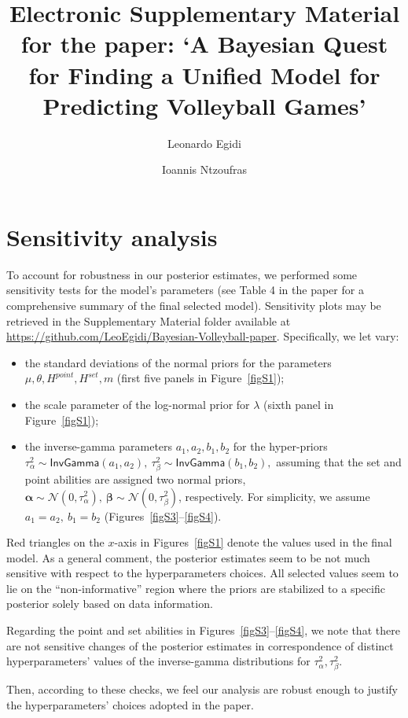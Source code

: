 \documentclass{statsoc}
\title[]{Electronic Supplementary Material for the paper: `A Bayesian Quest for Finding a Unified Model for Predicting Volleyball Games'}
\author[Egidi and Ntzoufras]{Leonardo Egidi}
\author[Egidi and Ntzoufras]{Ioannis Ntzoufras}
\begin{document}
\maketitle



\section*{Sensitivity analysis}

To account for robustness in our posterior estimates, we performed some sensitivity tests for the model's parameters (see Table 4 in the paper for a comprehensive summary of the final selected model). Sensitivity plots may be retrieved in the Supplementary Material folder available at \url{https://github.com/LeoEgidi/Bayesian-Volleyball-paper}. Specifically, we let vary: 


\begin{itemize}
\item the standard deviations of the normal priors for the parameters $\mu, \theta, H^{point}, H^{set}, m$
(first five panels in Figure~\ref{figS1});
\item  the scale parameter of the log-normal prior for $\lambda$ (sixth panel in Figure~\ref{figS1});
\item the inverse-gamma parameters $a_1, a_2, b_1, b_2$ for the hyper-priors $\tau^2_{\alpha} \sim \mathsf{InvGamma}(a_1,a_2), \ \tau^2_{\beta} \sim \mathsf{InvGamma}(b_1,b_2),$ assuming that the set and point abilities are assigned two normal priors, $\bm{\alpha} \sim \mathcal{N}(0, \tau^2_{\alpha}),\ \bm{\beta} \sim \mathcal{N}(0, \tau^2_{\beta}) $, respectively. For simplicity, we assume $a_1=a_2,\ b_1=b_2$ (Figures~\ref{figS3}--\ref{figS4}).
\end{itemize}
%
Red triangles on the $x$-axis in Figures~\ref{figS1} denote the values used in the final model. As a general comment, the posterior estimates seem to be not much sensitive with respect to the hyperparameters choices. All selected values seem to lie on the ``non-informative'' region where the priors are stabilized to a specific posterior solely based on data information. 

Regarding the point and set abilities in Figures~\ref{figS3}--\ref{figS4}, we note that there are not sensitive changes of the posterior estimates in correspondence of distinct hyperparameters' values of the inverse-gamma distributions for $\tau^2_{\alpha}, \tau^2_{\beta}$.

Then, according to these checks, we feel our analysis are robust enough to justify the hyperparameters' choices adopted in the paper.
\end{document}
